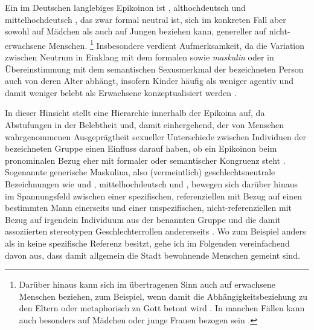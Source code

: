 Ein im Deutschen langlebiges Epikoinon ist ,
althochdeutsch  und
mittelhochdeutsch , das zwar formal neutral
ist, sich im konkreten Fall aber sowohl auf Mädchen als auch auf Jungen
beziehen kann, genereller auf nicht-erwachsene Menschen.%
%
	\footnote{Darüber hinaus kann sich  im übertragenen Sinn auch auf
		erwachsene Menschen beziehen, zum Beispiel, wenn damit die
		Abhängigkeitsbeziehung zu den Eltern oder metaphorisch zu Gott betont
		wird \autocite[s.\,v.~\textit{kint}]{lexer:mhdhwb}. In manchen Fällen
		kann  auch besonders auf Mädchen oder junge Frauen bezogen
		sein \autocites[808--816]{drw7}[s.\,v.~\textit{Kind}]{duden-online}.}
%
Insbesondere  verdient Aufmerksamkeit, da die Variation zwischen
Neutrum in Einklang mit dem formalen  sowie \emph{maskulin}
oder  in Übereinstimmung mit dem semantischen Sexusmerkmal der
bezeichneten Person auch von deren Alter abhängt, insofern Kinder häufig als
weniger agentiv und damit weniger belebt als Erwachsene konzeptualisiert werden
\autocites[196]{comrie1989}[258--259]{birkenesfleischer2022}[151]{klein2022}.

In dieser Hinsicht stellt \citet[172--174]{klein2022} eine Hierarchie innerhalb
der Epikoina auf, da Abstufungen in der Belebtheit und, damit einhergehend, der
von Menschen wahrgenommenen Ausgeprägtheit sexueller Unterschiede zwischen
Individuen der bezeichneten Gruppe einen Einfluss darauf haben, ob ein
Epikoinon beim pronominalen Bezug eher mit formaler oder semantischer Kongruenz
steht \autocite[vgl.~auch][74--83]{kotthoffnuebling2018}. Sogenannte generische
Maskulina, also (vermeintlich) geschlechtsneutrale
Bezeichnungen wie  und ,
mittelhochdeutsch  und ,
bewegen sich darüber hinaus im Spannungsfeld zwischen einer spezifischen,
referenziellen  mit Bezug auf einen bestimmten Mann
einerseits und einer unspezifischen, nicht-referenziellen  mit
Bezug auf irgendein Individuum aus der benannten Gruppe und die damit
assoziierten stereotypen Geschlechterrollen andererseits
\autocites[91--122]{kotthoffnuebling2018}[159--160, 179--180]{klein2022}. Wo
zum Beispiel  anders als in  keine
spezifische Referenz besitzt, gehe ich im Folgenden vereinfachend davon aus,
dass damit allgemein die Stadt bewohnende Menschen gemeint sind.

